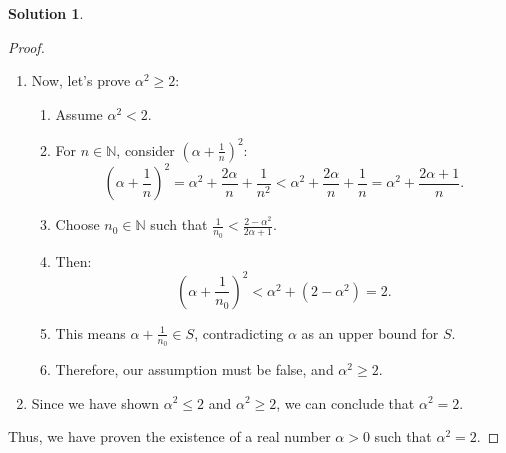 \documentclass[12pt]{article}
\theoremstyle{definition} %
\newtheorem{solution}{Solution}
\theoremstyle{plain} %
\begin{document}
\begin{solution}
\begin{proof}
\begin{enumerate}
\begin{enumerate}
            \end{enumerate}
            \item Now, let's prove $\alpha^2 \geq 2$:
            \begin{enumerate}
                \item Assume $\alpha^2 < 2$.
                \item For $n \in \mathbb{N}$, consider $(\alpha + \frac{1}{n})^2$:
                $$
                \left( \alpha + \frac{1}{n} \right)^2 = \alpha^2 + \frac{2\alpha}{n} + \frac{1}{n^2} < \alpha^2 + \frac{2\alpha}{n} + \frac{1}{n} = \alpha^2 + \frac{2\alpha + 1}{n}.
                $$
                \item Choose $n_0 \in \mathbb{N}$ such that $\frac{1}{n_0} < \frac{2 - \alpha^2}{2\alpha + 1}$.
                \item Then:
                $$
                \left( \alpha + \frac{1}{n_0} \right)^2 < \alpha^2 + (2 - \alpha^2) = 2.
                $$
                \item This means $\alpha + \frac{1}{n_0} \in S$, contradicting $\alpha$ as an upper bound for $S$.
                \item Therefore, our assumption must be false, and $\alpha^2 \geq 2$.
            \end{enumerate}
            \item Since we have shown $\alpha^2 \leq 2$ and $\alpha^2 \geq 2$, we can conclude that $\alpha^2 = 2$.
        \end{enumerate}
        
        Thus, we have proven the existence of a real number $\alpha > 0$ such that $\alpha^2 = 2$. 
        
    \end{proof}
\end{solution}
\end{document}
